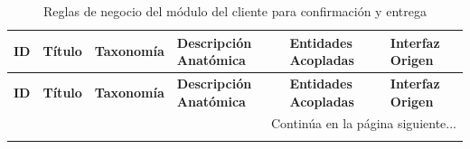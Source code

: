 \begin{landscape}
\begin{longtable}[c]{l p{2.1cm} p{2.1cm} p{8cm} p{4cm} p{3cm}}
\caption{Reglas de negocio del módulo del cliente para confirmación y entrega} \label{tab:reglas-negocio-cliente-confirmacion-entrega}\\
\toprule
\textbf{ID} & \textbf{Título} & \textbf{Taxonomía} & \textbf{Descripción Anatómica} & \textbf{Entidades Acopladas} & \textbf{Interfaz Origen} \\
\midrule
\endfirsthead

\toprule
\textbf{ID} & \textbf{Título} & \textbf{Taxonomía} & \textbf{Descripción Anatómica} & \textbf{Entidades Acopladas} & \textbf{Interfaz Origen} \\
\midrule
\endhead

\midrule
\multicolumn{6}{r}{\small Continúa en la página siguiente...} \\
\endfoot
\bottomrule
\endlastfoot


\end{longtable}
\end{landscape}
